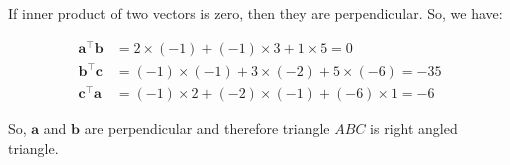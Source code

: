 \documentclass[journal,12pt,twocolumn]{IEEEtran}
\let\vec\mathbf
\begin{document}
\begin{enumerate}[start=17]
If inner product of two vectors is zero, then they are perpendicular. So, we have:

\begin{align}
    \vec{a}^\top \vec{b} &= 2\times(-1) + (-1)\times3 + 1\times5 = 0\\
    \vec{b}^\top \vec{c} &= (-1)\times(-1) + 3\times(-2) + 5\times(-6) = -35\\
    \vec{c}^\top \vec{a} &= (-1)\times2 + (-2)\times(-1) + (-6)\times1 = -6
\end{align}

So, $\vec{a}$ and $\vec{b}$ are perpendicular and therefore triangle $ABC$ is right angled triangle.

\end {enumerate}
\end{document}
